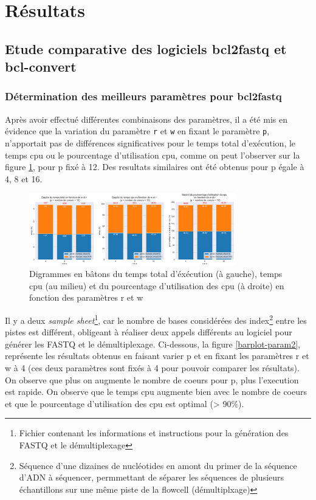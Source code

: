 \section{Résultats}
\subsection{Etude comparative des logiciels bcl2fastq et bcl-convert}
\subsubsection{Détermination des meilleurs paramètres pour bcl2fastq}
Après avoir effectué différentes combinaisons des paramètres, il a été mis en évidence que la variation du paramètre \texttt{r} et \texttt{w} en fixant le paramètre \texttt{p}, n'apportait pas de différences significatives pour le temps total d'exécution, le temps cpu ou le pourcentage d'utilisation cpu, comme on peut l'observer sur la figure \ref{barplot-param}, pour p fixé à 12. Des resultats similaires ont été obtenus pour p égale à 4, 8 et 16. 

\begin{figure}[H]
    \centering
    \includegraphics[width=0.8\textwidth]{img/barplot_cum_jarvis2.png}
    \caption{\footnotesize{Digrammes en bâtons du temps total d'éxécution (à gauche), temps cpu (au milieu) et du pourcentage d'utilisation des cpu (à droite) en fonction des paramètres r et w}}
    \label{barplot-param}
\end{figure}

Il y a deux \emph{sample sheet}\footnote{Fichier contenant les informations et instructions pour la génération des FASTQ et le démultiplexage}, car le nombre de bases considérées des index\footnote{Séquence d'une dizaines de nucléotides en amont du primer de la séquence d'ADN à séquencer, permmettant de séparer les séquences de plusieurs échantillons sur une même piste de la flowcell (démultiplxage)} entre les pistes est différent, obligeant à réaliser deux appels différents au logiciel pour générer les FASTQ et le démultiplexage. Ci-dessous, la figure \ref{barplot-param2}, représente les résultats obtenus en faisant varier p et en fixant les paramètres r et w à 4 (ces deux paramètres sont fixés à 4 pour pouvoir comparer les résultats). On observe que plus on augmente le nombre de coeurs pour p, plus l'execution est rapide. On observe que le temps cpu augmente bien avec le nombre de coeurs et que le pourcentage d'utilisation des cpu est optimal (> 90\%).


